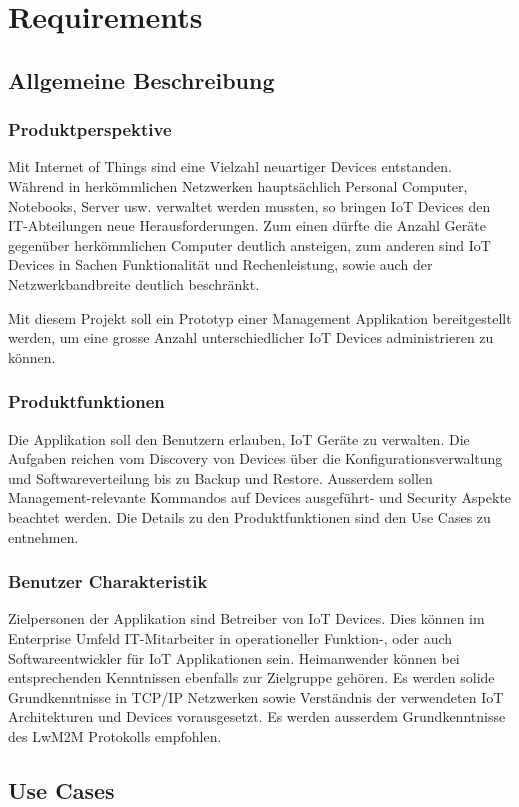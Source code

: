 \chapter{Requirements}
\section{Allgemeine Beschreibung}
\subsection{Produktperspektive}
Mit Internet of Things sind eine Vielzahl neuartiger Devices entstanden. Während in herkömmlichen Netzwerken hauptsächlich Personal Computer, Notebooks, Server usw. verwaltet werden mussten, so bringen IoT Devices den IT-Abteilungen neue Herausforderungen. Zum einen dürfte die Anzahl Geräte gegenüber herkömmlichen Computer deutlich ansteigen, zum anderen sind IoT Devices in Sachen Funktionalität und Rechenleistung, sowie auch der Netzwerkbandbreite deutlich beschränkt. 

Mit diesem Projekt soll ein Prototyp einer Management Applikation bereitgestellt werden, um eine grosse Anzahl unterschiedlicher IoT Devices administrieren zu können. 
\subsection{Produktfunktionen}
Die Applikation soll den Benutzern erlauben, IoT Geräte zu verwalten. Die Aufgaben reichen vom Discovery von Devices über die Konfigurationsverwaltung und Softwareverteilung bis zu Backup und Restore. Ausserdem sollen Management-relevante Kommandos auf Devices ausgeführt- und Security Aspekte beachtet werden. Die Details zu den Produktfunktionen sind den Use Cases zu entnehmen.

\subsection{Benutzer Charakteristik}
\label{sec:benutzercharakteristik}
Zielpersonen der Applikation sind Betreiber von IoT Devices. Dies können im Enterprise Umfeld IT-Mitarbeiter in operationeller Funktion-, oder auch Softwareentwickler für IoT Applikationen sein. Heimanwender können bei entsprechenden Kenntnissen ebenfalls zur Zielgruppe gehören. Es werden solide Grundkenntnisse in TCP/IP Netzwerken sowie Verständnis der verwendeten IoT Architekturen und Devices vorausgesetzt. Es werden ausserdem Grundkenntnisse des LwM2M Protokolls empfohlen. 
\section{Use Cases}
\label{sec:usecases}
